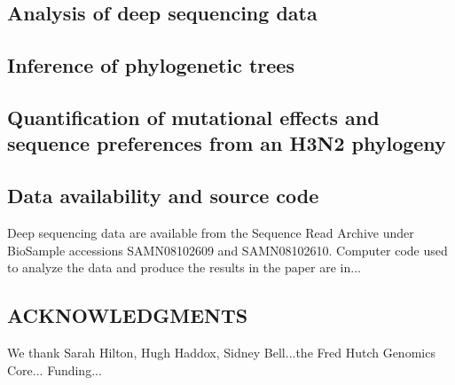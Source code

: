 \documentclass[11pt]{article}
\begin{document}
\subsection*{Analysis of deep sequencing data}

\subsection*{Inference of phylogenetic trees}

\subsection*{Quantification of mutational effects and sequence preferences from an H3N2 phylogeny}

\subsection*{Data availability and source code}
Deep sequencing data are available from the Sequence Read Archive under BioSample accessions SAMN08102609 and SAMN08102610. Computer code used to analyze the data and produce the results in the paper are in...


\subsection*{ACKNOWLEDGMENTS}
We thank Sarah Hilton, Hugh Haddox, Sidney Bell...the Fred Hutch Genomics Core...
Funding...





\clearpage
\normalsize
\end{document}
